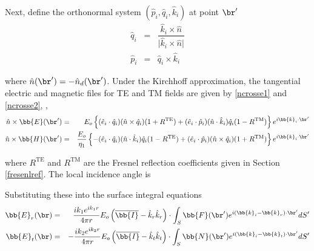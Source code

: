 Next, define the orthonormal system $(\hat{p}_i,\hat{q}_i,\hat{k}_i)$ at point $\br'$ 
\begin{eqnarray}
\hat{q}_i &=& \dfrac{\hat{k}_i \times \hat{n} }{ \vert \hat{k}_i \times \hat{n} \vert } \\
\hat{p}_i &=& \hat{q}_i \times \hat{k}_i 
\end{eqnarray}

\noindent where $\hat{n}(\br') = -\hat{n}_d(\br')$.  Under the Kirchhoff approximation, the tangential electric and magnetic files for TE and TM fields are given by \eqref{ncrosse1} and \eqref{ncrosse2}, \cite{kong1986electromagnetic}, 
\begin{eqnarray}
\hat{n} \times \bb{E}(\br') & = & E_o\left\{ (\hat{e}_i \cdot \hat{q}_i )(\hat{n} \times \hat{q}_i) (1 + R^{\textrm{TE}}) + 
(\hat{e}_i \cdot \hat{p}_i )(\hat{n} \cdot \hat{k}_i) \hat{q}_i (1 - R^{\textrm{TM}}) \right\} e^{i\bb{k}_i \cdot \br'} \label{ncrosse1}  \\
\hat{n} \times \bb{H}(\br') & = & \dfrac{E_o}{\eta_1}\left\{ -(\hat{e}_i \cdot \hat{q}_i )(\hat{n} \cdot \hat{k}_i) \hat{q}_i (1 - R^{\textrm{TE}}) + (\hat{e}_i \cdot \hat{p}_i )(\hat{n} \times \hat{q}_i) (1 + R^{\textrm{TM}}) \right\} e^{i\bb{k}_i \cdot \br'}  \label{ncrosse2}
\end{eqnarray}

\noindent where $R^{\textrm{TE}}$ and $R^{\textrm{TM}}$ are the Fresnel reflection coefficients given in Section \ref{fresenlref}. The local incidence angle is

Substituting these into the surface integral equations
\begin{eqnarray}
\bb{E}_r(\br) & = & \dfrac{ik_1e^{ik_1r}}{4\pi r} E_o \left( \overline{\bb{I}} - \hat{k}_r \hat{k}_r \right)  \cdot \int_S  \bb{F}(\br') e^{i (\bb{k}_i - \bb{k}_r) \cdot \br'} dS' \label{kirchint1} \\
\bb{E}_t(\br) & = & -\dfrac{ik_2e^{ik_2r}}{4\pi r} E_o \left( \overline{\bb{I}} - \hat{k}_t \hat{k}_t \right)  \cdot \int_S  \bb{N}(\br') e^{i (\bb{k}_i - \bb{k}_t) \cdot \br'} dS' \label{kirchint2} 
\end{eqnarray}

